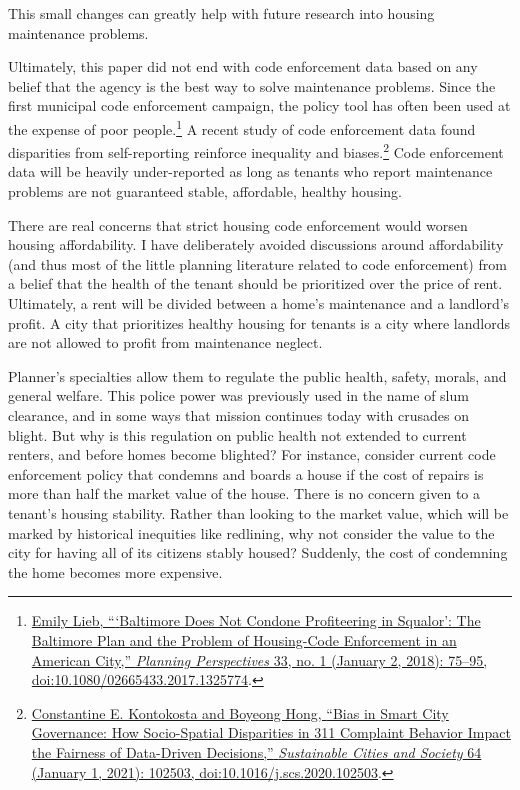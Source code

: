 \documentclass[
  openany]{book}
\begin{document}
This small changes can greatly help with future research into housing maintenance problems.

Ultimately, this paper did not end with code enforcement data based on any belief that the agency is the best way to solve maintenance problems. Since the first municipal code enforcement campaign, the policy tool has often been used at the expense of poor people.\footnote{\protect\hyperlink{ref-lieb2018}{Emily Lieb, {``{`}Baltimore Does Not Condone Profiteering in Squalor{'}: The Baltimore Plan and the Problem of Housing-Code Enforcement in an American City,''} \emph{Planning Perspectives} 33, no. 1 (January 2, 2018): 75--95, doi:\href{https://doi.org/10.1080/02665433.2017.1325774}{10.1080/02665433.2017.1325774}}.} A recent study of code enforcement data found disparities from self-reporting reinforce inequality and biases.\footnote{\protect\hyperlink{ref-kontokosta2021}{Constantine E. Kontokosta and Boyeong Hong, {``Bias in Smart City Governance: How Socio-Spatial Disparities in 311 Complaint Behavior Impact the Fairness of Data-Driven Decisions,''} \emph{Sustainable Cities and Society} 64 (January 1, 2021): 102503, doi:\href{https://doi.org/10.1016/j.scs.2020.102503}{10.1016/j.scs.2020.102503}}.} Code enforcement data will be heavily under-reported as long as tenants who report maintenance problems are not guaranteed stable, affordable, healthy housing.

There are real concerns that strict housing code enforcement would worsen housing affordability. I have deliberately avoided discussions around affordability (and thus most of the little planning literature related to code enforcement) from a belief that the health of the tenant should be prioritized over the price of rent. Ultimately, a rent will be divided between a home's maintenance and a landlord's profit. A city that prioritizes healthy housing for tenants is a city where landlords are not allowed to profit from maintenance neglect.

Planner's specialties allow them to regulate the public health, safety, morals, and general welfare. This police power was previously used in the name of slum clearance, and in some ways that mission continues today with crusades on blight. But why is this regulation on public health not extended to current renters, and before homes become blighted? For instance, consider current code enforcement policy that condemns and boards a house if the cost of repairs is more than half the market value of the house. There is no concern given to a tenant's housing stability. Rather than looking to the market value, which will be marked by historical inequities like redlining, why not consider the value to the city for having all of its citizens stably housed? Suddenly, the cost of condemning the home becomes more expensive.
\end{document}
